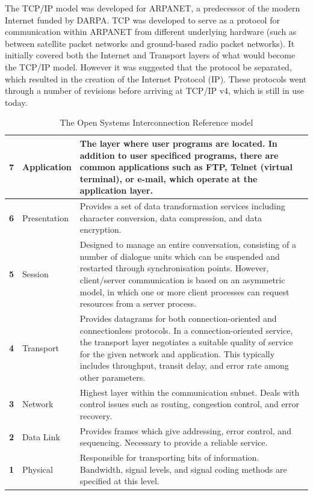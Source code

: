 The TCP/IP model was developed for ARPANET, a predecessor of the modern Internet funded by DARPA. TCP was developed to serve as a protocol for communication within ARPANET from different underlying hardware (such as between satellite packet networks and ground-based radio packet networks). It initially covered both the Internet and Transport layers of what would become the TCP/IP model. However it was suggested that the protocol be separated, which resulted in the creation of the Internet Protocol (IP). These protocols went through a number of revisions before arriving at TCP/IP v4, which is still in use today.

\begin{table}[t]
  \caption{The Open Systems Interconnection Reference model \cite{networks01}}
  \begin{center}
    \begin{tabularx}{\textwidth}{|c|l|X|}
      \hline
      \textbf{7} & Application & The layer where user programs are located. In addition to user specificed programs, there are common applications such as FTP, Telnet (virtual terminal), or e-mail, which operate at the application layer. \\ \hline
      \textbf{6} & Presentation & Provides a set of data transformation services including character conversion, data compression, and data encryption. \\ \hline
      \textbf{5} & Session & Designed to manage an entire conversation, consisting of a number of dialogue units which can be suspended and restarted through synchronisation points. However, \mbox{client/}server communication is based on an asymmetric model, in which one or more client processes can request resources from a server process. \\ \hline
      \textbf{4} & Transport & Provides datagrams for both connection-oriented and connectionless protocols. In a connection-oriented service, the transport layer negotiates a suitable quality of service for the given network and application. This typically includes throughput, transit delay, and error rate among other parameters. \\ \hline
      \textbf{3} & Network & Highest layer within the communication subnet. Deals with control issues such as routing, congestion control, and error recovery. \\ \hline
      \textbf{2} & Data Link & Provides frames which give addressing, error control, and sequencing. Necessary to provide a reliable service. \\ \hline
      \textbf{1} & Physical & Responsible for transporting bits of information. Bandwidth, signal levels, and signal coding methods are specified at this level. \\ \hline
    \end{tabularx}
  \end{center}
\label{osi_model}
\end{table}

